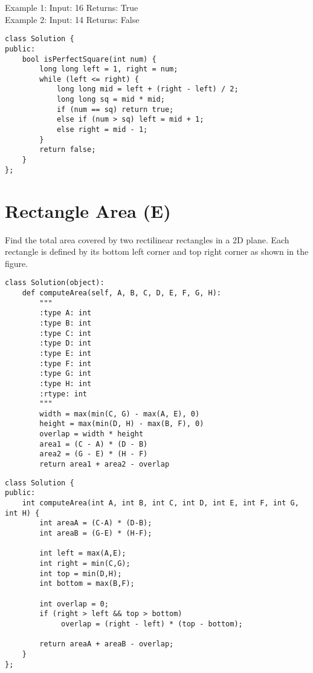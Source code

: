 Example 1:
Input: 16
Returns: True\\

Example 2:
Input: 14
Returns: False\\

\begin{lstlisting}
class Solution {
public:
    bool isPerfectSquare(int num) {
        long long left = 1, right = num;
        while (left <= right) {
            long long mid = left + (right - left) / 2;
            long long sq = mid * mid; 
            if (num == sq) return true;
            else if (num > sq) left = mid + 1;
            else right = mid - 1;
        }
        return false;     
    }
};
\end{lstlisting}


\section{Rectangle Area (E)}
Find the total area covered by two rectilinear rectangles in a 2D plane. Each rectangle is defined by its bottom left corner and top right corner as shown in the figure. \\

\begin{lstlisting}
class Solution(object):
    def computeArea(self, A, B, C, D, E, F, G, H):
        """
        :type A: int
        :type B: int
        :type C: int
        :type D: int
        :type E: int
        :type F: int
        :type G: int
        :type H: int
        :rtype: int
        """
        width = max(min(C, G) - max(A, E), 0)
        height = max(min(D, H) - max(B, F), 0)
        overlap = width * height
        area1 = (C - A) * (D - B)
        area2 = (G - E) * (H - F)
        return area1 + area2 - overlap
\end{lstlisting}

\begin{lstlisting}
class Solution {
public:
    int computeArea(int A, int B, int C, int D, int E, int F, int G, int H) {
        int areaA = (C-A) * (D-B);
        int areaB = (G-E) * (H-F);
        
        int left = max(A,E);
        int right = min(C,G);
        int top = min(D,H);
        int bottom = max(B,F);
        
        int overlap = 0;
        if (right > left && top > bottom)
             overlap = (right - left) * (top - bottom);
             
        return areaA + areaB - overlap;
    }
};
\end{lstlisting}

